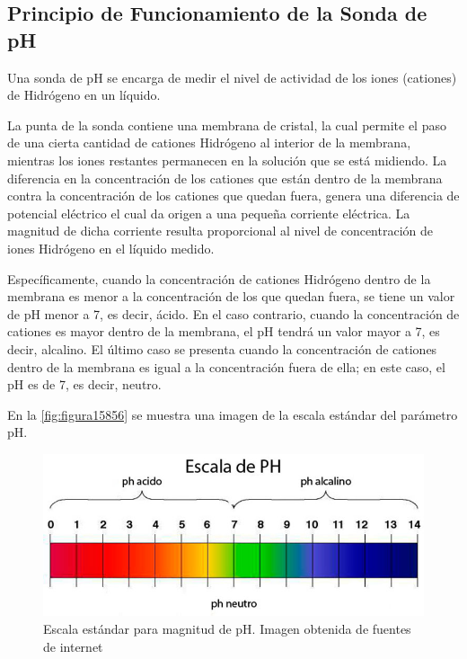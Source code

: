 \subsection{Principio de Funcionamiento de la Sonda de pH}

Una sonda de pH se encarga de medir el nivel de actividad de los iones (cationes) de Hidrógeno en un líquido.

La punta de la sonda contiene una membrana de cristal, la cual permite el paso de una cierta cantidad de cationes Hidrógeno al interior de la membrana, mientras los iones restantes permanecen en la solución que se está midiendo. 
La diferencia en la concentración de los cationes que están dentro de la membrana contra la concentración de los cationes que quedan fuera, genera una diferencia de potencial eléctrico el cual da origen a una pequeña corriente 
eléctrica. La magnitud de dicha corriente resulta proporcional al nivel de concentración de iones Hidrógeno en el líquido medido.

Específicamente, cuando la concentración de cationes Hidrógeno dentro de la membrana es menor a la concentración de los que quedan fuera, se tiene un valor de pH menor a 7, es decir, ácido. En el caso contrario, cuando la 
concentración de cationes es mayor dentro de la membrana, el pH tendrá un valor mayor a 7, es decir, alcalino. El último caso se presenta cuando la concentración de cationes dentro de la membrana es igual a la concentración 
fuera de ella; en este caso, el pH es de 7, es decir, neutro.

En la \autoref{fig:figura15856} se muestra una imagen de la escala estándar del parámetro pH.

\clearpage

\begin{figure}[h]
	\centering
	\includegraphics[scale=0.6]{imgss204.jpg}
	\caption{Escala estándar para magnitud de pH. Imagen obtenida de fuentes de internet}
	\label{fig:figura15856}
\end{figure}

